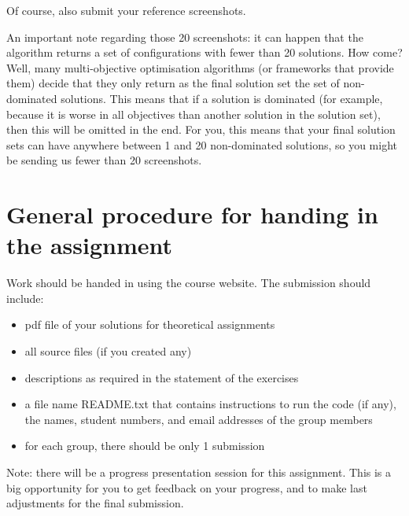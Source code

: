 \documentclass{pracs}
\begin{document}
Of course, also submit your reference screenshots.

An important note regarding those 20 screenshots: it can happen that the algorithm returns a set of configurations with fewer than 20 solutions. How come? Well, many multi-objective optimisation algorithms (or frameworks that provide them) decide that they only return as the final solution set the set of non-dominated solutions. This means that if a solution is dominated (for example, because it is worse in all objectives than another solution in the solution set), then this will be omitted in the end. For you, this means that your final solution sets can have anywhere between 1 and 20 non-dominated solutions, so you might be sending us fewer than 20 screenshots.


\section{General procedure for handing in the assignment}
Work should be handed in using the course website. The submission should include:
\begin{itemize}
\item pdf file of your solutions for theoretical assignments
\item all source files (if you created any)
\item descriptions as required in the statement of the exercises
\item a file name README.txt that contains instructions to run the code (if any), the names, student numbers, and email addresses of the group members
\item for each group, there should be only 1 submission
\end{itemize}

Note: there will be a progress presentation session for this assignment. This is a big opportunity for you to get feedback on your progress, and to make last adjustments for the final submission.
\end{document}

